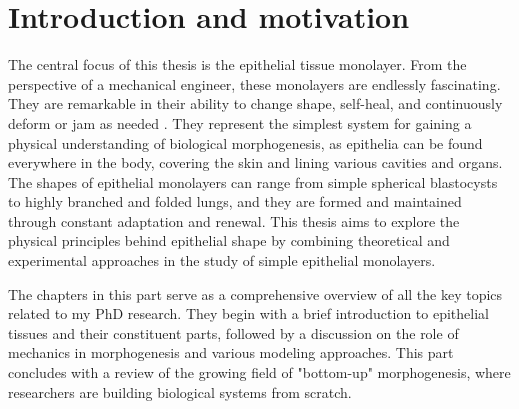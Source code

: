 \documentclass[11pt, final, a4paper, twoside, openright]{book}
\begin{document}
	\InitializeThesis
	
	 
	
	
	
	\frontmatter
	
	
	
	
	\mainmatter
	\part{Introduction and motivation}\label{part_1}
	
	The central focus of this thesis is the epithelial tissue monolayer. From the perspective of a mechanical engineer, these monolayers are endlessly fascinating. They are remarkable in their ability to change shape, self-heal, and continuously deform or jam as needed \cite{xi2018}. They represent the simplest system for gaining a physical understanding of biological morphogenesis, as epithelia can be found everywhere in the body, covering the skin and lining various cavities and organs. The shapes of epithelial monolayers can range from simple spherical blastocysts to highly branched and folded lungs, and they are formed and maintained through constant adaptation and renewal. This thesis aims to explore the physical principles behind epithelial shape by combining theoretical and experimental approaches in the study of simple epithelial monolayers.
	
	The chapters in this part serve as a comprehensive overview of all the key topics related to my PhD research. They begin with a brief introduction to epithelial tissues and their constituent parts, followed by a discussion on the role of mechanics in morphogenesis and various modeling approaches. This part concludes with a review of the growing field of "bottom-up" morphogenesis, where researchers are building biological systems from scratch.

\end{document}
